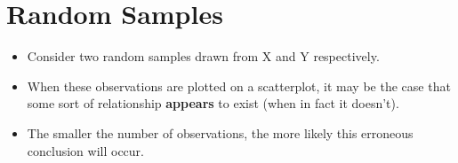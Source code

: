 \documentclass[]{report}
\begin{document}
{%
%
%
%
%
%


%











\section{Random Samples}
\begin{itemize}
\item Consider two random samples drawn from X and Y respectively.
\item When these observations are plotted on a scatterplot, it
may be the case that some sort of relationship \textbf{appears} to exist (when in fact it doesn't).
\item The smaller the number of observations, the more likely this erroneous conclusion will occur.
\end{itemize}



}
\end{document}

